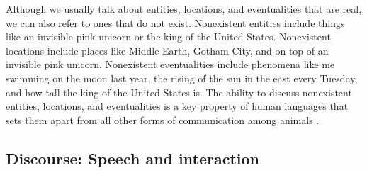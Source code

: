 Although we usually talk about entities, locations, and eventualities that are real, we can also refer to ones that do not exist. Nonexistent entities include things like an invisible pink unicorn or the king of the United States. Nonexistent locations include places like Middle Earth, Gotham City, and on top of an invisible pink unicorn. Nonexistent eventualities include phenomena like me swimming on the moon last year, the rising of the sun in the east every Tuesday, and how tall the king of the United States is. The ability to discuss nonexistent entities, locations, and eventualities is a key property of human languages that sets them apart from all other forms of communication among animals \parencite{hockett:1960}.



\subsection{Discourse: Speech and interaction}\label{sec:intro-ling-disc}










\stopcontents[chapters]